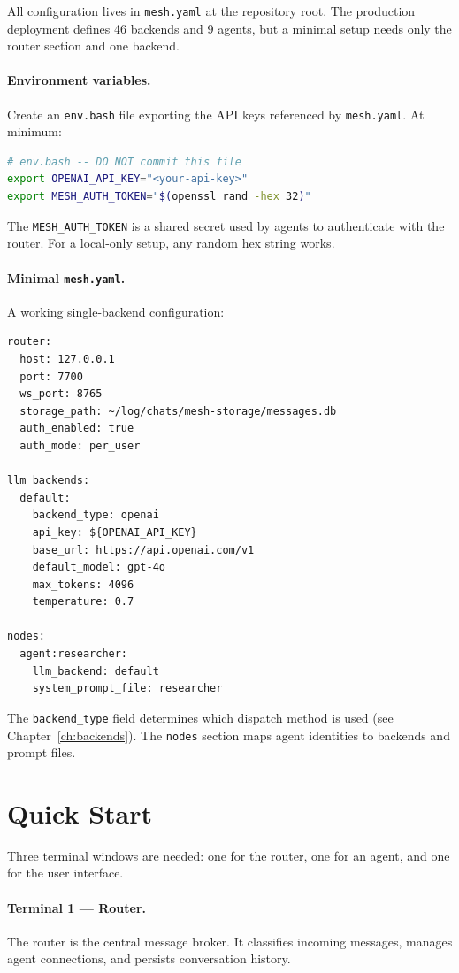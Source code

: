 \documentclass[11pt,letterpaper]{report}
\newcommand{\code}[1]{\texttt{#1}}
\begin{document}
All configuration lives in \code{mesh.yaml} at the repository root.
The production deployment defines 46 backends and 9 agents, but a
minimal setup needs only the router section and one backend.

\paragraph{Environment variables.}
Create an \code{env.bash} file exporting the API keys referenced by
\code{mesh.yaml}. At minimum:

\begin{lstlisting}[language=bash]
# env.bash -- DO NOT commit this file
export OPENAI_API_KEY="<your-api-key>"
export MESH_AUTH_TOKEN="$(openssl rand -hex 32)"
\end{lstlisting}

The \code{MESH\_AUTH\_TOKEN} is a shared secret used by agents to
authenticate with the router. For a local-only setup, any random
hex string works.

\paragraph{Minimal \code{mesh.yaml}.}
A working single-backend configuration:

\begin{lstlisting}
router:
  host: 127.0.0.1
  port: 7700
  ws_port: 8765
  storage_path: ~/log/chats/mesh-storage/messages.db
  auth_enabled: true
  auth_mode: per_user

llm_backends:
  default:
    backend_type: openai
    api_key: ${OPENAI_API_KEY}
    base_url: https://api.openai.com/v1
    default_model: gpt-4o
    max_tokens: 4096
    temperature: 0.7

nodes:
  agent:researcher:
    llm_backend: default
    system_prompt_file: researcher
\end{lstlisting}

The \code{backend\_type} field determines which dispatch method is used
(see Chapter~\ref{ch:backends}). The \code{nodes} section maps agent
identities to backends and prompt files.

\section{Quick Start}

Three terminal windows are needed: one for the router, one for an
agent, and one for the user interface.

\paragraph{Terminal 1 --- Router.}
The router is the central message broker. It classifies incoming
messages, manages agent connections, and persists conversation history.
\end{document}
